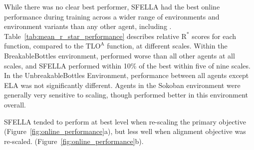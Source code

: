 While there was no clear best performer, SFELLA had the best online performance during training across a wider range of environments and environment variants than any other agent, including \tloA{}. Table~\ref{tab:mean_r_star_performance} describes relative $\text{R}^*$ scores for each function, compared to the $\text{TLO}^\text{A}$ function, at different scales.  Within the BreakableBottles environment, \tloA{} performed worse than all other agents at all scales, and SFELLA performed within 10\% of the best within five of nine scales. In the UnbreakableBottles Environment, performance between all agents except ELA was not significantly different. Agents in the Sokoban environment were generally very sensitive to scaling, though \tloA{} performed better in this environment overall. 



SFELLA tended to perform at best level when re-scaling the primary objective (Figure~\ref{fig:online_performance}a), but less well when alignment objective was re-scaled. (Figure~\ref{fig:online_performance}b).

